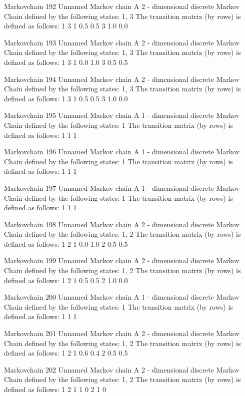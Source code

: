 \documentclass[
  nojss]{jss}
\begin{document}
\begin{CodeChunk}
\begin{CodeOutput}
Markovchain  192 
Unnamed Markov chain 
 A  2 - dimensional discrete Markov Chain defined by the following states: 
 1, 3 
 The transition matrix  (by rows)  is defined as follows: 
    1   3
1 0.5 0.5
3 1.0 0.0

Markovchain  193 
Unnamed Markov chain 
 A  2 - dimensional discrete Markov Chain defined by the following states: 
 1, 3 
 The transition matrix  (by rows)  is defined as follows: 
    1   3
1 0.0 1.0
3 0.5 0.5

Markovchain  194 
Unnamed Markov chain 
 A  2 - dimensional discrete Markov Chain defined by the following states: 
 1, 3 
 The transition matrix  (by rows)  is defined as follows: 
    1   3
1 0.5 0.5
3 1.0 0.0

Markovchain  195 
Unnamed Markov chain 
 A  1 - dimensional discrete Markov Chain defined by the following states: 
 1 
 The transition matrix  (by rows)  is defined as follows: 
  1
1 1

Markovchain  196 
Unnamed Markov chain 
 A  1 - dimensional discrete Markov Chain defined by the following states: 
 1 
 The transition matrix  (by rows)  is defined as follows: 
  1
1 1

Markovchain  197 
Unnamed Markov chain 
 A  1 - dimensional discrete Markov Chain defined by the following states: 
 1 
 The transition matrix  (by rows)  is defined as follows: 
  1
1 1

Markovchain  198 
Unnamed Markov chain 
 A  2 - dimensional discrete Markov Chain defined by the following states: 
 1, 2 
 The transition matrix  (by rows)  is defined as follows: 
    1   2
1 0.0 1.0
2 0.5 0.5

Markovchain  199 
Unnamed Markov chain 
 A  2 - dimensional discrete Markov Chain defined by the following states: 
 1, 2 
 The transition matrix  (by rows)  is defined as follows: 
    1   2
1 0.5 0.5
2 1.0 0.0

Markovchain  200 
Unnamed Markov chain 
 A  1 - dimensional discrete Markov Chain defined by the following states: 
 1 
 The transition matrix  (by rows)  is defined as follows: 
  1
1 1

Markovchain  201 
Unnamed Markov chain 
 A  2 - dimensional discrete Markov Chain defined by the following states: 
 1, 2 
 The transition matrix  (by rows)  is defined as follows: 
    1   2
1 0.6 0.4
2 0.5 0.5

Markovchain  202 
Unnamed Markov chain 
 A  2 - dimensional discrete Markov Chain defined by the following states: 
 1, 2 
 The transition matrix  (by rows)  is defined as follows: 
  1 2
1 1 0
2 1 0


\end{CodeOutput}
\end{CodeChunk}
\end{document}
